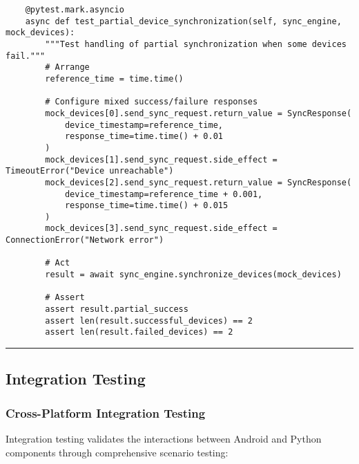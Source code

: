 \documentclass[11pt,a4paper]{report}
\begin{document}
\begin{verbatim}
    @pytest.mark.asyncio
    async def test_partial_device_synchronization(self, sync_engine, mock_devices):
        """Test handling of partial synchronization when some devices fail."""
        # Arrange
        reference_time = time.time()

        # Configure mixed success/failure responses
        mock_devices[0].send_sync_request.return_value = SyncResponse(
            device_timestamp=reference_time,
            response_time=time.time() + 0.01
        )
        mock_devices[1].send_sync_request.side_effect = TimeoutError("Device unreachable")
        mock_devices[2].send_sync_request.return_value = SyncResponse(
            device_timestamp=reference_time + 0.001,
            response_time=time.time() + 0.015
        )
        mock_devices[3].send_sync_request.side_effect = ConnectionError("Network error")

        # Act
        result = await sync_engine.synchronize_devices(mock_devices)

        # Assert
        assert result.partial_success
        assert len(result.successful_devices) == 2
        assert len(result.failed_devices) == 2
\end{verbatim}

\hrule

\subsection{Integration Testing}

\subsubsection{Cross-Platform Integration Testing}

Integration testing validates the interactions between Android and Python components through comprehensive scenario
testing:
\end{document}
